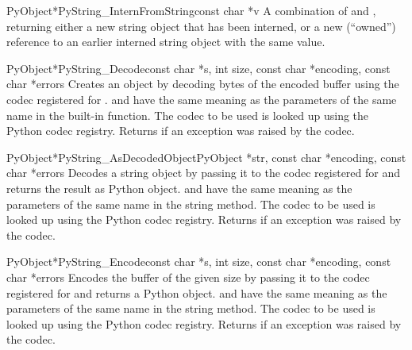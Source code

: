 \begin{cfuncdesc}{PyObject*}{PyString_InternFromString}{const char *v}
  A combination of  and
  , returning either a new string
  object that has been interned, or a new (``owned'') reference to an
  earlier interned string object with the same value.
\end{cfuncdesc}

\begin{cfuncdesc}{PyObject*}{PyString_Decode}{const char *s,
                                               int size,
                                               const char *encoding,
                                               const char *errors}
  Creates an object by decoding  bytes of the encoded
  buffer  using the codec registered for
  .   and  have the same
  meaning as the parameters of the same name in the
   built-in function.  The codec to be used is
  looked up using the Python codec registry.  Returns \NULL{} if
  an exception was raised by the codec.
\end{cfuncdesc}

\begin{cfuncdesc}{PyObject*}{PyString_AsDecodedObject}{PyObject *str,
                                               const char *encoding,
                                               const char *errors}
  Decodes a string object by passing it to the codec registered for
   and returns the result as Python
  object.  and  have the same meaning as the
  parameters of the same name in the string  method.
  The codec to be used is looked up using the Python codec registry.
  Returns \NULL{} if an exception was raised by the codec.
\end{cfuncdesc}

\begin{cfuncdesc}{PyObject*}{PyString_Encode}{const char *s,
                                               int size,
                                               const char *encoding,
                                               const char *errors}
  Encodes the  buffer of the given size by passing it to
  the codec registered for  and returns a Python object.
   and  have the same meaning as the
  parameters of the same name in the string  method.
  The codec to be used is looked up using the Python codec
  registry.  Returns \NULL{} if an exception was raised by the
  codec.
\end{cfuncdesc}


